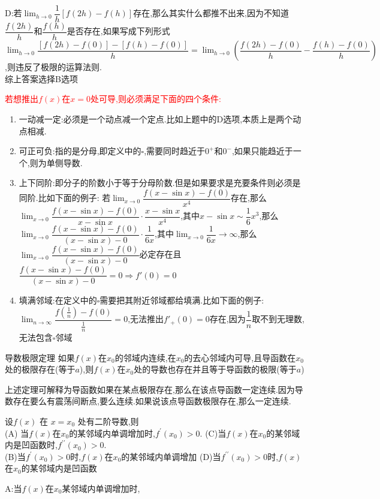 \documentclass[8pt a4paper, oneside, UTF8]{ctexbook}  %
\begin{document}
\begin{sloppypar}
\begin{solution}
        D:若$\lim_{h \to 0}\dfrac{1}{h}[f(2h)-f(h)]$存在,那么其实什么都推不出来,因为不知道$\dfrac{f(2h)}{h}$和$\dfrac{f(h)}{h}$是否存在,如果写成下列形式$\lim_{h \to 0}\dfrac{[f(2h)-f(0)]-[f(h)-f(0)]}{h}=\lim_{h \to 0}\left(\dfrac{f(2h)-f(0)}{h}-\dfrac{f(h)-f(0)}{h}\right)$,则违反了极限的运算法则.\\
        综上答案选择B选项
    \end{solution}
    \begin{note}
        \textcolor{red}{若想推出$f(x)$在$x=0$处可导,则必须满足下面的四个条件:}
        \begin{enumerate}
            \item 一动减一定:必须是一个动点减一个定点.比如上题中的D选项,本质上是两个动点相减.
            \item 可正可负:指的是分母,即定义中的$\square$,需要同时趋近于$0^+$和$0^-$,如果只能趋近于一个,则为单侧导数.
            \item 上下同阶:即分子的阶数小于等于分母阶数.但是如果要求是充要条件则必须是同阶.比如下面的例子:
            若$\lim_{x\to 0}\dfrac{f(x-\sin x)-f(0)}{x^4}$存在,那么$\lim_{x\to 0}\dfrac{f(x-\sin x)-f(0)}{x-\sin x}\cdot \dfrac{x - \sin x}{x^4}$,其中$ x - \sin x \sim \dfrac{1}{6}x^3$,那么$\lim_{x\to 0}\dfrac{f(x-\sin x)-f(0)}{(x-\sin x)-0}\cdot \dfrac{1}{6x}$,其中$\lim_{x\to 0} \dfrac{1}{6x} \to \infty$,那么$\lim_{x\to 0}\dfrac{f(x-\sin x)-f(0)}{(x-\sin x)-0}$必定存在且$\dfrac{f(x-\sin x)-f(0)}{(x-\sin x)-0}=0 \Rightarrow f'(0)=0$
            \item 填满邻域:在定义中的$\square$需要把其附近邻域都给填满.比如下面的例子:$\lim_{n\to \infty}\dfrac{f(\frac{1}{n})-f(0)}{\frac{1}{n}}=0$,无法推出$f'_+(0)=0$存在,因为$\dfrac{1}{n}$取不到无理数,无法包含$\square$邻域
        \end{enumerate}
    \end{note}
    \begin{them}{导数极限定理}{}\label{dsjxdl}
        如果$f(x)$在$x_0$的邻域内连续,在$x_{0}$的去心邻域内可导,且导函数在$x_{0}$处的极限存在(等于$a$),则$f(x)$在$x_0$处的导数也存在并且等于导函数的极限(等于$a$)
    \end{them}
        上述定理可解释为导函数如果在某点极限存在,那么在该点导函数一定连续.因为导数存在要么有震荡间断点,要么连续.如果说该点导函数极限存在,那么一定连续.
    \begin{problem}
        设$f(x)$ 在 $x=x_0$ 处有二阶导数,则\\
        (A) 当$f(x)$在$x_0$的某邻域内单调增加时,$f^\prime(x_0)>0.$
        (C)当$f(x)$在$x_0$的某邻域内是凹函数时,$f^{\prime\prime}(x_0)>0.$\\
        (B)当$f^\prime(x_0)>0$时,$f(x)$在$x_0$的某邻域内单调增加
        (D)当$f^{\prime\prime}(x_0)>0$时,$f(x)$在$x_0$的某邻域内是凹函数
    \end{problem}
    \begin{solution}
        A:当$f(x)$在$x_0$某邻域内单调增加时,
    \end{solution}
    \begin{note}
            

\end{note}
\end{sloppypar}
\end{document}
